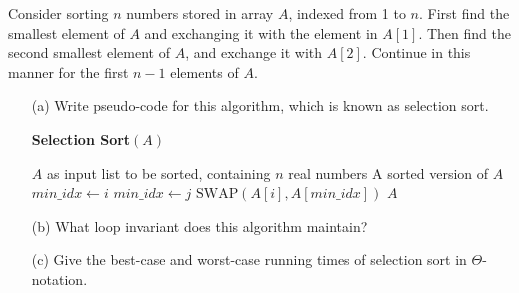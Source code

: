 \noindent {} 
Consider sorting $n$ numbers stored in array $A$, indexed from 1 to $n$. First find the smallest element of $A$ and exchanging it with the element in $A[1]$. Then find the second smallest element of $A$, and exchange it with $A[2]$. Continue in this manner for the first $n - 1$ elements of $A$. 
\begin{enumerate}
    \item[(a)] Write pseudo-code for this algorithm, which is known as selection sort. 
\vspace{-7pt}
\begin{algorithm}[h]
\caption{\textbf{Selection Sort}$(A)$} \label{alg:selection-sort}
\begin{algorithmic}[1]
\Require $A$ as input list to be sorted, containing $n$ real numbers
\Ensure A sorted version of $A$
    \State $min\_idx \leftarrow i$
            \State $min\_idx \leftarrow j$
        \EndIf
    \EndFor
    \State $\mathrm{SWAP}(A[i], A[min\_idx])$
\EndFor
\State \Return $A$
\end{algorithmic}
\end{algorithm}
    \item[(b)] What loop invariant does this algorithm maintain? \\
    \item[(c)] Give the best-case and worst-case running times of selection sort in $\Theta$-notation. \\
\end{enumerate}
